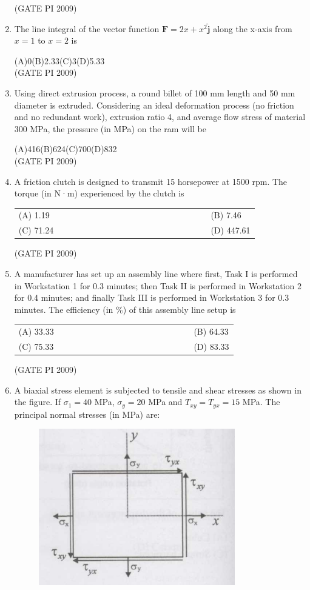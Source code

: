 \documentclass[journal,12pt,onecolumn]{IEEEtran}
\theoremstyle{remark}
\begin{document}
\begin{enumerate}[label=Q.\arabic*, leftmargin=*]
\begin{enumerate}[label=(\Alph*)]
\end{enumerate}
\hfill (GATE PI 2009)
\item The line integral of the vector function $\mathbf{F} = 2x + x^2 \mathbf{\hat{j}}$ along the x-axis from $x=1$ to $x=2$ is

(A)0\hfill(B)2.33\hfill(C)3\hfill(D)5.33 \\

\hfill (GATE PI 2009)
\item Using direct extrusion process, a round billet of 100 mm length and 50 mm diameter is extruded. Considering an ideal deformation process (no friction and no redundant work), extrusion ratio 4, and average flow stress of material 300 MPa, the pressure (in MPa) on the ram will be

(A)416\hfill(B)624\hfill(C)700\hfill(D)832\\

\hfill (GATE PI 2009)
\item A friction clutch is designed to transmit 15 horsepower at 1500 rpm. The torque (in N·m) experienced by the clutch is
\begin{multicols}{2}
\begin{tabular}[t]{p{0.8\linewidth} p{0.9\linewidth}}
(A) 1.19 & (B) 7.46 \\
(C) 71.24 & (D) 447.61 \\
\end{tabular}
\end{multicols}

\hfill (GATE PI 2009)
\item A manufacturer has set up an assembly line where first, Task I is performed in Workstation 1 for 0.3 minutes; then Task II is performed in Workstation 2 for 0.4 minutes; and finally Task III is performed in Workstation 3 for 0.3 minutes. The efficiency (in \%) of this assembly line setup is
\begin{multicols}{2}
\begin{tabular}[t]{p{0.8\linewidth} p{0.9\linewidth}}
(A) 33.33 & (B) 64.33 \\
(C) 75.33 & (D) 83.33 \\
\end{tabular}
\end{multicols}
\hfill (GATE PI 2009)

\item A biaxial stress element is subjected to tensile and shear stresses as shown in the figure. If $\sigma_1 = 40$ MPa, $\sigma_y = 20$ MPa and \(T_{xy} = T_{yx} = 15\) MPa. The principal normal stresses (in MPa) are:
\newpage
\begin{figure}[h]
    \centering
    \includegraphics[width=0.3\linewidth]{figs/2.png}
    \label{fig:placeholder}
\end{figure} 


\end{enumerate}
\end{document}
